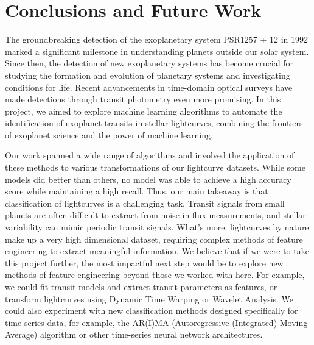\documentclass{article}
\begin{document}


\section{Conclusions and Future Work}

The groundbreaking detection of the exoplanetary system PSR1257 + 12 in 1992 marked a significant milestone in understanding planets outside our solar system. Since then, the detection of new exoplanetary systems has become crucial for studying the formation and evolution of planetary systems and investigating conditions for life. Recent advancements in time-domain optical surveys have made detections through transit photometry even more promising. In this project, we aimed to explore machine learning algorithms to automate the identification of exoplanet transits in stellar lightcurves, combining the frontiers of exoplanet science and the power of machine learning.

Our work spanned a wide range of algorithms and involved the application of these methods to various transformations of our lightcurve datasets. While some models did better than others, no model was able to achieve a high accuracy score while maintaining a high recall. Thus, our main takeaway is that classification of lightcurves is a challenging task. Transit signals from small planets are often difficult to extract from noise in flux measurements, and stellar variability can mimic periodic transit signals. What's more, lightcurves by nature make up a very high dimensional dataset, requiring complex methods of feature engineering to extract meaningful information. We believe that if we were to take this project further, the most impactful next step would be to explore new methods of feature engineering beyond those we worked with here. For example, we could
fit transit models and extract transit parameters as features, or transform lightcurves using Dynamic Time Warping or Wavelet Analysis. We could also experiment with new classification methods designed specifically for time-series data, for example, the AR(I)MA (Autoregressive (Integrated) Moving Average) algorithm or other time-series neural network architectures. 
\end{document}

